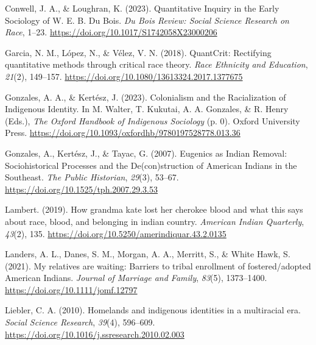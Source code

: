 \documentclass[
  12pt,
  letterpaper,
]{article}
\newlength{\cslhangindent}
\newlength{\cslentryspacingunit} %
\newenvironment{CSLReferences}[2] %
 {%
  \setlength{\parindent}{0pt}
  \ifodd #1
  \let\oldpar\par
  \def\par{\hangindent=\cslhangindent\oldpar}
  \fi
  \setlength{\parskip}{#2\cslentryspacingunit}
 }%
 {}
\begin{document}
\hypertarget{refs}{}
\begin{CSLReferences}{1}{0}
\leavevmode{}%
Conwell, J. A., \& Loughran, K. (2023). Quantitative {Inquiry} in the
{Early} {Sociology} of {W}. {E}. {B}. {Du} {Bois}. \emph{Du Bois Review:
Social Science Research on Race}, 1--23.
\url{https://doi.org/10.1017/S1742058X23000206}

\leavevmode{}%
Garcia, N. M., López, N., \& Vélez, V. N. (2018). {QuantCrit}:
Rectifying quantitative methods through critical race theory. \emph{Race
Ethnicity and Education}, \emph{21}(2), 149--157.
\url{https://doi.org/10.1080/13613324.2017.1377675}

\leavevmode{}%
Gonzales, A. A., \& Kertész, J. (2023). Colonialism and the
{Racialization} of {Indigenous} {Identity}. In M. Walter, T. Kukutai, A.
A. Gonzales, \& R. Henry (Eds.), \emph{The {Oxford} {Handbook} of
{Indigenous} {Sociology}} (p. 0). Oxford University Press.
\url{https://doi.org/10.1093/oxfordhb/9780197528778.013.36}

\leavevmode{}%
Gonzales, A., Kertész, J., \& Tayac, G. (2007). Eugenics as {Indian}
{Removal}: {Sociohistorical} {Processes} and the {De}(con)struction of
{American} {Indians} in the {Southeast}. \emph{The Public Historian},
\emph{29}(3), 53--67. \url{https://doi.org/10.1525/tph.2007.29.3.53}

\leavevmode{}%
Lambert. (2019). How grandma kate lost her cherokee blood and what this
says about race, blood, and belonging in indian country. \emph{American
Indian Quarterly}, \emph{43}(2), 135.
\url{https://doi.org/10.5250/amerindiquar.43.2.0135}

\leavevmode{}%
Landers, A. L., Danes, S. M., Morgan, A. A., Merritt, S., \& White Hawk,
S. (2021). My relatives are waiting: Barriers to tribal enrollment of
fostered/adopted American Indians. \emph{Journal of Marriage and
Family}, \emph{83}(5), 1373--1400.
\url{https://doi.org/10.1111/jomf.12797}

\leavevmode{}%
Liebler, C. A. (2010). Homelands and indigenous identities in a
multiracial era. \emph{Social Science Research}, \emph{39}(4), 596--609.
\url{https://doi.org/10.1016/j.ssresearch.2010.02.003}


\end{CSLReferences}
\end{document}

